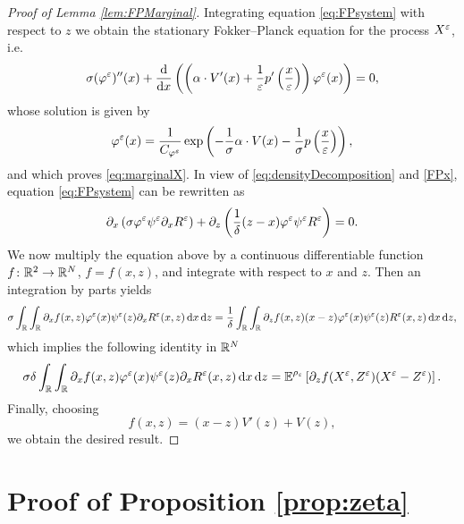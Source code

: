 \documentclass[10pt]{article}
\begin{document}
\begin{appendices}
\begin{proof}[Proof of Lemma \ref{lem:FPMarginal}] Integrating equation \eqref{eq:FPsystem} with respect to $z$ we obtain the stationary Fokker--Planck equation for the process $X^\varepsilon$, i.e.
	\begin{equation}
	\label{FPx}
	\sigma (\varphi^\varepsilon)''(x) + \frac{\mathrm{d}}{\mathrm{d} x} \left( \left ( \alpha \cdot V'(x) + \frac{1}{\varepsilon} p' \left ( \frac{x}{\varepsilon} \right ) \right ) \varphi^\varepsilon(x)\right) = 0,
	\end{equation}
	whose solution is given by
	\begin{equation}
	\varphi^\varepsilon(x) = \frac{1}{C_{\varphi^\varepsilon}} \exp\left(- \frac{1}{\sigma} \alpha \cdot V(x) - \frac{1}{\sigma} p \left ( \frac{x}{\varepsilon} \right )\right),
	\end{equation}
	and which proves \eqref{eq:marginalX}. In view of \eqref{eq:densityDecomposition} and \eqref{FPx}, equation \eqref{eq:FPsystem} can be rewritten as
	\begin{equation}\label{eq:psiEqualityPDE}
	\partial_x \left( \sigma \varphi^\varepsilon \psi^\varepsilon \partial_x R^\varepsilon \right) + \partial_z \left( \frac1\delta(z-x) \varphi^\varepsilon \psi^\varepsilon R^\varepsilon \right) = 0.
	\end{equation}
	We now multiply the equation above by a continuous differentiable function $f \colon \mathbb{R}^2 \to \mathbb{R}^N$, $f = f(x,z)$, and integrate with respect to $x$ and $z$. Then an integration by parts yields
	\begin{equation}
	\sigma \int_{\mathbb{R}} \int_{\mathbb{R}} \partial_x f(x,z) \varphi^\varepsilon(x) \psi^\varepsilon(z) \partial_x R^\varepsilon(x,z) \,\mathrm{d} x \,\mathrm{d} z = \frac1\delta \int_{\mathbb{R}} \int_{\mathbb{R}} \partial_z f(x,z) (x-z) \varphi^\varepsilon(x) \psi^\varepsilon(z) R^\varepsilon(x,z) \,\mathrm{d} x \,\mathrm{d} z,
	\end{equation}
	which implies the following identity in $\mathbb{R}^N$
	\begin{equation}
	\sigma \delta \int_{\mathbb{R}} \int_{\mathbb{R}} \partial_x f(x,z) \varphi^\varepsilon(x) \psi^\varepsilon(z) \partial_x R^\varepsilon(x,z) \,\mathrm{d} x \,\mathrm{d} z = \operatorname{\mathbb{E}}^{\rho_\varepsilon} \left[ \partial_z f(X^\varepsilon,Z^\varepsilon) (X^\varepsilon-Z^\varepsilon) \right].
	\end{equation}
	Finally, choosing 
	\begin{equation}
	f(x,z) = (x - z) V'(z) + V(z),
	\end{equation}
	we obtain the desired result.
\end{proof}

\section{Proof of Proposition \ref{prop:zeta}}\label{ap:ProofDistance}


\end{appendices}
\end{document}
